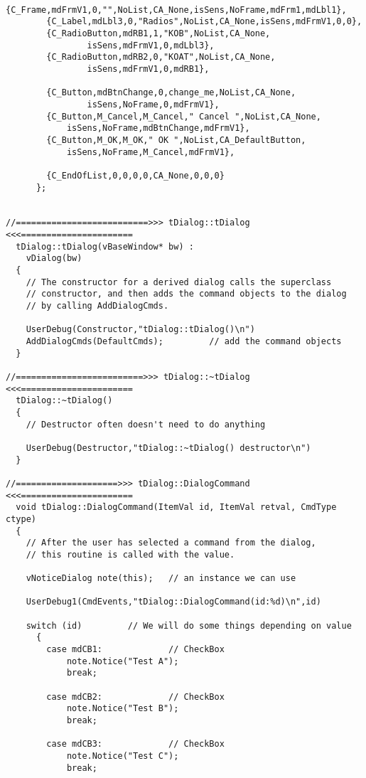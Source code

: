 \begin{verbatim}
        {C_Frame,mdFrmV1,0,"",NoList,CA_None,isSens,NoFrame,mdFrm1,mdLbl1},
        {C_Label,mdLbl3,0,"Radios",NoList,CA_None,isSens,mdFrmV1,0,0},
        {C_RadioButton,mdRB1,1,"KOB",NoList,CA_None,
                isSens,mdFrmV1,0,mdLbl3},
        {C_RadioButton,mdRB2,0,"KOAT",NoList,CA_None,
                isSens,mdFrmV1,0,mdRB1},

        {C_Button,mdBtnChange,0,change_me,NoList,CA_None,
                isSens,NoFrame,0,mdFrmV1},
        {C_Button,M_Cancel,M_Cancel," Cancel ",NoList,CA_None,
            isSens,NoFrame,mdBtnChange,mdFrmV1},
        {C_Button,M_OK,M_OK," OK ",NoList,CA_DefaultButton,
            isSens,NoFrame,M_Cancel,mdFrmV1},

        {C_EndOfList,0,0,0,0,CA_None,0,0,0}
      };


//==========================>>> tDialog::tDialog <<<======================
  tDialog::tDialog(vBaseWindow* bw) :
    vDialog(bw)
  {
    // The constructor for a derived dialog calls the superclass
    // constructor, and then adds the command objects to the dialog
    // by calling AddDialogCmds.

    UserDebug(Constructor,"tDialog::tDialog()\n")
    AddDialogCmds(DefaultCmds);         // add the command objects
  }

//=========================>>> tDialog::~tDialog <<<======================
  tDialog::~tDialog()
  {
    // Destructor often doesn't need to do anything

    UserDebug(Destructor,"tDialog::~tDialog() destructor\n")
  }

//====================>>> tDialog::DialogCommand <<<======================
  void tDialog::DialogCommand(ItemVal id, ItemVal retval, CmdType ctype)
  {
    // After the user has selected a command from the dialog,
    // this routine is called with the value.

    vNoticeDialog note(this);   // an instance we can use

    UserDebug1(CmdEvents,"tDialog::DialogCommand(id:%d)\n",id)

    switch (id)         // We will do some things depending on value
      {
        case mdCB1:             // CheckBox
            note.Notice("Test A");
            break;

        case mdCB2:             // CheckBox
            note.Notice("Test B");
            break;

        case mdCB3:             // CheckBox
            note.Notice("Test C");
            break;


\end{verbatim}
